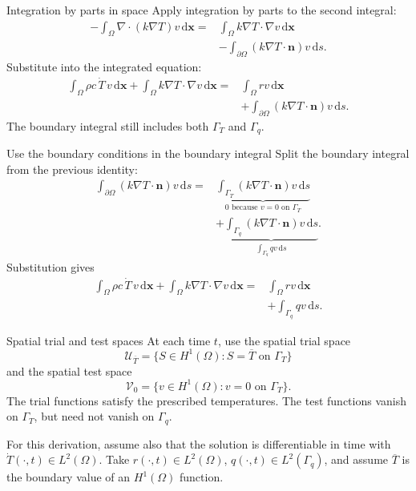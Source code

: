 \documentclass[11pt,aspectratio=169]{beamer}
\newcommand{\dd}{\mathrm d}
\newcommand{\bx}{\bm x}
\newcommand{\Vzero}{\mathcal V_0}
\begin{document}
\begin{frame}{Integration by parts in space}
Apply integration by parts to the second integral:
\[
\begin{aligned}
-\int_\Omega\nabla\!\cdot(k\nabla T)v\,\dd\bx
={}&\int_\Omega k\nabla T\cdot\nabla v\,\dd\bx\\
&-\int_{\partial\Omega}(k\nabla T\cdot\bm n)v\,\dd s.
\end{aligned}
\]
Substitute into the integrated equation:
\[
\begin{aligned}
\int_\Omega\rho c\,\dot T\,v\,\dd\bx
+\int_\Omega k\nabla T\cdot\nabla v\,\dd\bx
={}&\int_\Omega rv\,\dd\bx\\
&+\int_{\partial\Omega}(k\nabla T\cdot\bm n)v\,\dd s.
\end{aligned}
\]
The boundary integral still includes both $\Gamma_T$ and $\Gamma_q$.
\end{frame}

\begin{frame}{Use the boundary conditions in the boundary integral}
Split the boundary integral from the previous identity:
\[
\begin{aligned}
\int_{\partial\Omega}(k\nabla T\cdot\bm n)v\,\dd s
={}&\underbrace{\int_{\Gamma_T}(k\nabla T\cdot\bm n)v\,\dd s}_{0\text{ because }v=0\text{ on }\Gamma_T}\\
&+\underbrace{\int_{\Gamma_q}(k\nabla T\cdot\bm n)v\,\dd s}_{\int_{\Gamma_q}qv\,\dd s}.
\end{aligned}
\]
Substitution gives
\[
\boxed{\begin{aligned}
\int_\Omega\rho c\,\dot T\,v\,\dd\bx
+\int_\Omega k\nabla T\cdot\nabla v\,\dd\bx
={}&\int_\Omega rv\,\dd\bx\\
&+\int_{\Gamma_q}qv\,\dd s.
\end{aligned}}
\]
\end{frame}

\begin{frame}{Spatial trial and test spaces}
At each time $t$, use the spatial trial space
\[
\mathcal U_{\overline T}
=\{S\in H^1(\Omega):S=\overline T\text{ on }\Gamma_T\}
\]
and the spatial test space
\[
\Vzero=\{v\in H^1(\Omega):v=0\text{ on }\Gamma_T\}.
\]
The trial functions satisfy the prescribed temperatures.
The test functions vanish on $\Gamma_T$, but need not vanish on $\Gamma_q$.
\medskip

For this derivation, assume also that the solution is differentiable in time
with $\dot T(\cdot,t)\in L^2(\Omega)$.
Take $r(\cdot,t)\in L^2(\Omega)$, $q(\cdot,t)\in L^2(\Gamma_q)$,
and assume $\overline T$ is the boundary value of an $H^1(\Omega)$ function.
\end{frame}
\end{document}
